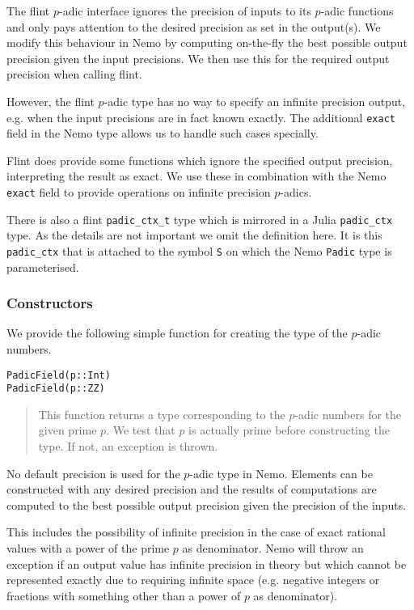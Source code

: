 \documentclass[a4paper,10pt]{article}
\newcommand{\code}{\lstinline}
\newcommand{\desc}[1]{\vspace{-3mm}\begin{quote}#1\end{quote}}
\begin{document}
{{{The flint $p$-adic interface ignores the precision of inputs to its $p$-adic
functions and only pays attention to the desired precision as set in the
output(s). We modify this behaviour in Nemo by computing on-the-fly the best
possible output precision given the input precisions. We then use this for the
required output precision when calling flint.

However, the flint $p$-adic type has no way to specify an infinite precision
output, e.g. when the input precisions are in fact known exactly. The
additional \code{exact} field in the Nemo type allows us to handle such cases
specially.

Flint does provide some functions which ignore the specified output precision,
interpreting the result as exact. We use these in combination with the Nemo
\code{exact} field to provide operations on infinite precision $p$-adics.

There is also a flint \code{padic_ctx_t} type which is mirrored in a Julia
\code{padic_ctx} type. As the details are not important we omit the definition
here. It is this \code{padic_ctx} that is attached to the symbol \code{S} on
which the Nemo \code{Padic} type is parameterised.

\subsubsection{Constructors}

We provide the following simple function for creating the type of the $p$-adic
numbers.

\begin{lstlisting}
PadicField(p::Int)
PadicField(p::ZZ)
\end{lstlisting}

\desc{This function returns a type corresponding to the $p$-adic numbers for
the given prime $p$. We test that $p$ is actually prime before constructing
the type. If not, an exception is thrown.}

No default precision is used for the $p$-adic type in Nemo. Elements can be
constructed with any desired precision and the results of computations are
computed to the best possible output precision given the precision of the
inputs. 

This includes the possibility of infinite precision in the case of exact
rational values with a power of the prime $p$ as denominator. Nemo will throw
an exception if an output value has infinite precision in theory but which
cannot be represented exactly due to requiring infinite space (e.g. negative
integers or fractions with something other than a power of $p$ as denominator).

}}}
\end{document}
